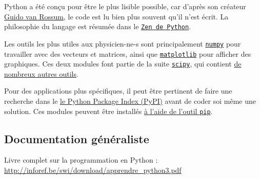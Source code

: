 \documentclass{article}
\begin{document}
Python a été conçu pour être le plus lisible possible, car d'après son créateur \href{https://fr.wikipedia.org/wiki/Guido_van_Rossum}{Guido van Rossum}, le code est lu bien plus souvent qu'il n'est écrit. La philosophie du langage est résumée dans le \href{https://fr.wikipedia.org/wiki/Zen_de_Python}{\texttt{Zen de Python}}.

Les outils les plus utiles aux physicien-ne-s sont principalement \href{http://www.numpy.org/}{\texttt{numpy}} pour travailler avec des vecteurs et matrices, ainsi que \href{https://matplotlib.org/}{\texttt{matplotlib}} pour afficher des graphiques. Ces deux modules font partie de la suite \href{https://scipy.org/about.html}{\texttt{scipy}}, qui contient \href{https://docs.scipy.org/doc/scipy/reference/index.html}{de nombreux autres outils}.

Pour des applications plus spécifiques, il peut être pertinent de faire une recherche dans le \href{https://pypi.org/}{le Python Package Index (PyPI)} avant de coder soi même une solution. Ces modules peuvent être installés \href{https://docs.python.org/fr/3.7/tutorial/venv.html#managing-packages-with-pip}{à l'aide de l'outil \texttt{pip}}.

\subsection*{Documentation généraliste}

Livre complet sur la programmation en Python :\\
\url{http://inforef.be/swi/download/apprendre_python3.pdf}





\end{document}
